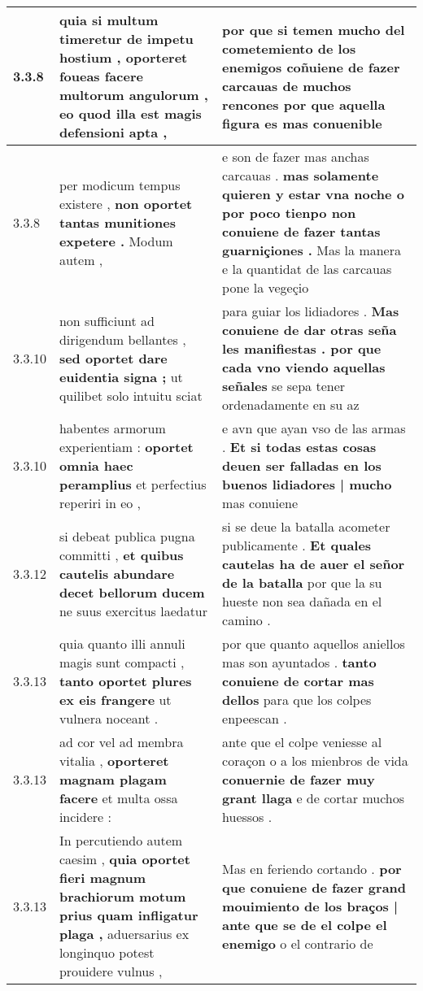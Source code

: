 \begin{tabular}{|p{1cm}|p{6.5cm}|p{6.5cm}|}
3.3.8 & quia si multum timeretur de impetu hostium , \textbf{ oporteret foueas facere multorum angulorum , } eo quod illa est magis defensioni apta , & por que si temen mucho del cometemiento de los enemigos \textbf{ coñuiene de fazer carcauas de muchos rencones } por que aquella figura es mas conuenible \\\hline
3.3.8 & per modicum tempus existere , \textbf{ non oportet tantas munitiones expetere . } Modum autem , & e son de fazer mas anchas carcauas . \textbf{ mas solamente quieren y estar vna noche o por poco tienpo non conuiene de fazer tantas guarniçiones . } Mas la manera e la quantidat de las carcauas pone la vegeçio \\\hline
3.3.10 & non sufficiunt ad dirigendum bellantes , \textbf{ sed oportet dare euidentia signa ; } ut quilibet solo intuitu sciat & para guiar los lidiadores . \textbf{ Mas conuiene de dar otras seña les manifiestas . por que cada vno viendo aquellas señales } se sepa tener ordenadamente en su az \\\hline
3.3.10 & habentes armorum experientiam : \textbf{ oportet omnia haec peramplius } et perfectius reperiri in eo , & e avn que ayan vso de las armas . \textbf{ Et si todas estas cosas deuen ser falladas en los buenos lidiadores | mucho } mas conuiene \\\hline
3.3.12 & si debeat publica pugna committi , \textbf{ et quibus cautelis abundare decet bellorum ducem } ne suus exercitus laedatur & si se deue la batalla acometer publicamente . \textbf{ Et quales cautelas ha de auer el señor de la batalla } por que la su hueste non sea dañada en el camino . \\\hline
3.3.13 & quia quanto illi annuli magis sunt compacti , \textbf{ tanto oportet plures ex eis frangere } ut vulnera noceant . & por que quanto aquellos aniellos mas son ayuntados . \textbf{ tanto conuiene de cortar mas dellos } para que los colpes enpeescan . \\\hline
3.3.13 & ad cor vel ad membra vitalia , \textbf{ oporteret magnam plagam facere } et multa ossa incidere : & ante que el colpe veniesse al coraçon o a los mienbros de vida \textbf{ conuernie de fazer muy grant llaga } e de cortar muchos huessos . \\\hline
3.3.13 & In percutiendo autem caesim , \textbf{ quia oportet fieri magnum brachiorum motum prius quam infligatur plaga , } aduersarius ex longinquo potest prouidere vulnus , & Mas en feriendo cortando . \textbf{ por que conuiene de fazer grand mouimiento de los braços | ante que se de el colpe el enemigo } o el contrario de \\\hline

\end{tabular}
